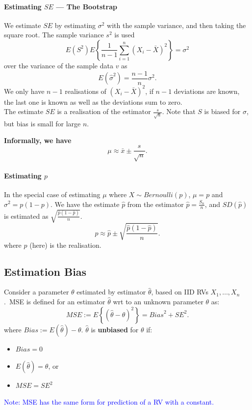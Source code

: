 \paragraph{Estimating $SE$ --- The Bootstrap}
We estimate $SE$ by estimating $\sigma^{2}$ with the
\textcolor{Bittersweet}{sample variance}, and then taking the square root. The
sample variance $s^{2}$ is used
\[E\left( S^{2} \right) E \left\{ \frac{1}{n-1}\sum_{i=1}^{n} {\left( X_i-\bar{X} \right) }^{2} \right\}=\sigma^{2}\] 
over the variance of the sample data $v$ as
\[E(\hat{\sigma}^{2})=\frac{n-1}{n}\sigma^{2}.\] 
We only have $n-1$ realisations of ${\left( X_i-\bar{X} \right) }^{2}$, if
$n-1$ deviations are known, the last one is known as well as the deviations sum
to zero.\\
The \textcolor{Bittersweet}{estimate} $SE$ is a realisation of the
\textcolor{Bittersweet}{estimator} $\frac{s}{\sqrt{n}}$.
Note that \textcolor{Bittersweet}{$S$ is biased for $\sigma$}, but bias is small for large $n$.

\textbf{Informally, we have}
\[\mu\approx\bar{x}\pm \frac{s}{\sqrt{n}}.\] 

\paragraph{Estimating $p$}
In the special case of estimating $\mu$ where $X\sim Bernoulli(p)$, $\mu=p$ and
$\sigma^{2}=p(1-p)$.  We have \textcolor{Bittersweet}{the estimate $\hat{p}$
from the estimator $\hat{p}=\frac{S_{n}}{n}$}, and $SD(\hat{p})$ is estimated
as $\sqrt{\frac{\hat{p}(1-\hat{p})}{n}}$.
\[p\approx \hat{p}\pm \sqrt{\frac{\hat{p}(1-\hat{p})}{n}}.\] 
where $\hat{p}$ (here) is the realisation.

\subsection{Estimation Bias}
Consider a parameter $\theta$ estimated by estimator $\hat{\theta}$, based on
IID RVs $X_1,\ldots,X_{n}$.\ \textcolor{Bittersweet}{MSE} is defined for an
estimator $\hat{\theta}$ wrt to an unknown parameter $\theta$ as:
\[MSE:=E \left\{ {\left( \hat{\theta}-\theta \right) }^{2}
\right\}={Bias}^{2}+{SE}^{2}.\]
where \textcolor{Bittersweet}{$Bias$}$:= E\left( \hat{\theta} \right) -\theta$.
$\hat{\theta}$ is \textbf{\textcolor{Bittersweet}{unbiased}} for $\theta$ if:
\begin{itemize}
  \item $Bias=0$
  \item $E\left( \hat{\theta} \right) =\theta$, or
  \item $MSE={SE}^{2}$
\end{itemize}
\textcolor{Blue}{Note: MSE has the same form for prediction of a RV with a constant.}

